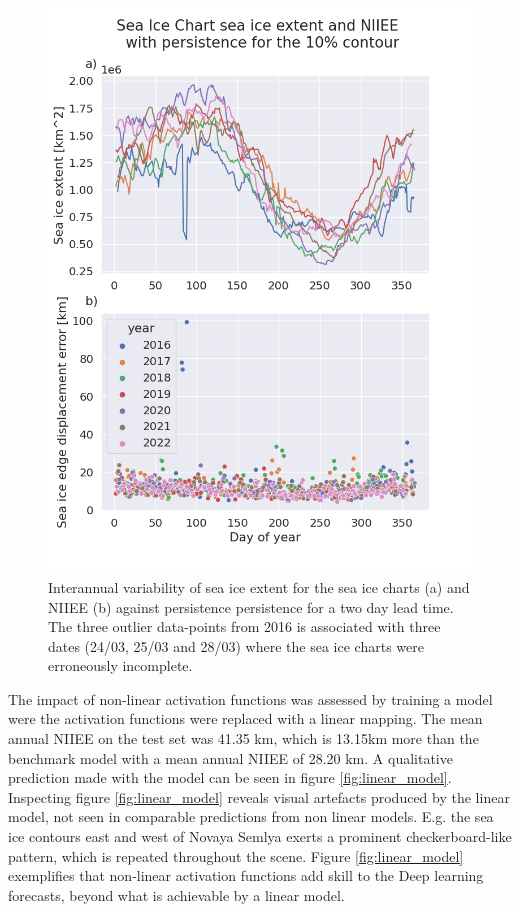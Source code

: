 \documentclass[../main/thesis]{subfiles}
\begin{document}
\begin{figure}
    \centering
    \includegraphics[width=.8\textwidth]{Persistence_NIIEE_SIE}
    \caption{\label{fig:NIIEE-and-SIE}Interannual variability of sea ice extent for the sea ice charts (a) and NIIEE (b) against persistence persistence for a two day lead time. The three outlier data-points from 2016 is associated with three dates (24/03, 25/03 and 28/03) where the sea ice charts were erroneously incomplete.}
\end{figure}

The impact of non-linear activation functions was assessed by training a model were the activation functions were replaced with a linear mapping. The mean annual NIIEE on the test set was 41.35 km, which is 13.15km more than the benchmark model with a mean annual NIIEE of 28.20 km. A qualitative prediction made with the model can be seen in figure \ref{fig:linear_model}. Inspecting figure \ref{fig:linear_model} reveals visual artefacts produced by the linear model, not seen in comparable predictions from non linear models. E.g. the sea ice contours east and west of Novaya Semlya exerts a prominent checkerboard-like pattern, which is repeated throughout the scene. Figure \ref{fig:linear_model} exemplifies that non-linear activation functions add skill to the Deep learning forecasts, beyond what is achievable by a linear model.
\end{document}
